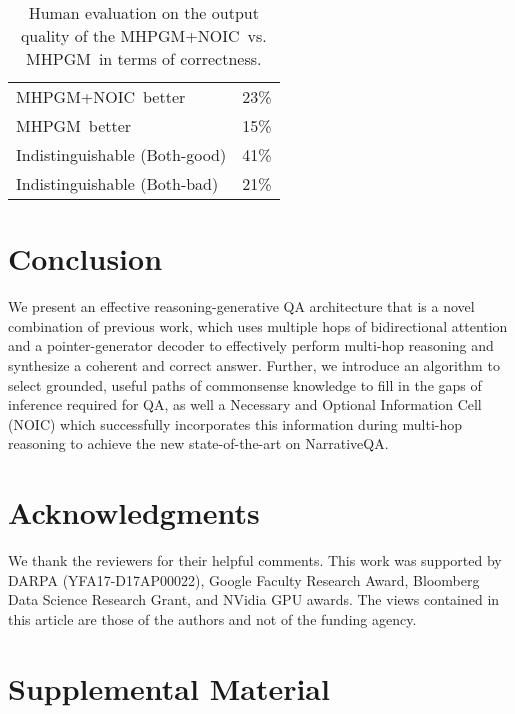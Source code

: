 \documentclass[11pt,a4paper]{article}
\newcommand{\baselineAbbv}{MHPGM}
\newcommand{\fullModel}{NOIC}
\begin{document}
\begin{table}
	\centering
    \begin{small}
    \begin{tabular}{l|c}\toprule
        \baselineAbbv+\fullModel\ better & 23\% \\
        \baselineAbbv\ better & 15\% \\
        Indistinguishable (Both-good) & 41\% \\
        Indistinguishable (Both-bad) & 21\% \\
    \bottomrule
    \end{tabular}
    \end{small}
    \vspace{-5pt}
    \caption{Human evaluation on the output quality of the \baselineAbbv+\fullModel\ vs. \baselineAbbv\ in terms of correctness.}
    \label{tab:human_eval}
    \vspace{-8pt}
\end{table}
 
 \section{Conclusion}
\label{sec:conclusion}
We present an effective reasoning-generative QA architecture that is a novel combination of previous work, which uses multiple hops of bidirectional attention and a pointer-generator decoder to effectively perform multi-hop reasoning and synthesize a coherent and correct answer.
Further, we introduce an algorithm to select grounded, useful paths of commonsense knowledge to fill in the gaps of inference required for QA, as well a Necessary and Optional Information Cell (NOIC) which successfully incorporates this information during multi-hop reasoning to achieve the new state-of-the-art on NarrativeQA.
 
\section*{Acknowledgments}
\vspace{-5pt}
We thank the reviewers for their helpful comments.
This work was supported by DARPA (YFA17-D17AP00022), Google Faculty Research Award, Bloomberg Data Science Research Grant, and NVidia GPU awards. The views contained in
this article are those of the authors and not of the funding agency.




\appendix
\section{Supplemental Material}
\end{document}
